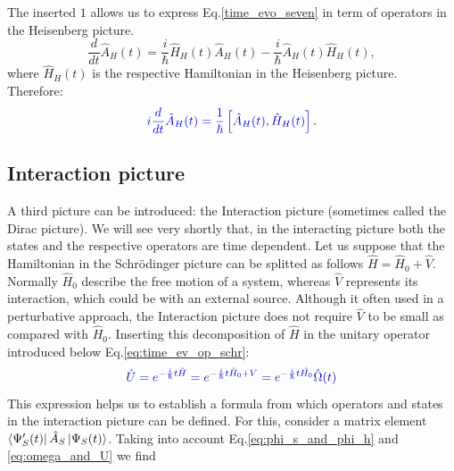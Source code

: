 \documentclass[12pt, titlepage]{article}
\begin{document}
The inserted $ 1 $ allows us to express Eq.\eqref{time_evo_seven} in term of operators in the Heisenberg picture.
\begin{equation}
\frac{d}{dt}\hat{A}_{H}(t)
	=\frac{i}{\hbar}
	\hat{H}_{H}(t)\hat{A}_{H}(t)
	-
	\frac{i}{\hbar}
	\hat{A}_{H}(t)\hat{H}_{H}(t),
\end{equation} 
where $ \hat{H}_{H}(t) $ is the respective Hamiltonian in the Heisenberg  picture.
Therefore:
\begin{equation}\label{eq:Heisenberg_time_dep._eq.}
\textcolor[RGB]{0,0,204}{
i\frac{d}{d t}\hat{A}_{H}(t)=
\frac{1}{\hbar}\left[ \hat{A}_{H}(t),\hat{H}_{H}(t)\right] 
.
}
\end{equation} 
\subsection{Interaction picture}
A third picture can be introduced: the Interaction picture (sometimes called the Dirac picture). We will see very shortly that, in the interacting picture both the states and the respective operators are time dependent.
Let us suppose that the Hamiltonian in the Schrödinger picture can be splitted as follows $ \hat{H} = \hat{H}_{0}+\hat{V} $. Normally $ \hat{H}_{0} $ describe the free motion of a system, whereas  $ \hat{V} $ represents its interaction, which could be with an external source. Although it often used in a perturbative approach, the Interaction picture does not require $ \hat{V} $  to be small as compared with $ \hat{H}_{0} $. 
Inserting this decomposition of $ \hat{H} $ in the unitary operator introduced below Eq.\eqref{eq:time_ev_op_schr}:
\begin{equation}\label{eq:omega_and_U}
\textcolor[RGB]{0,0,204}{
\hat{U}=e^{-\frac{i}{\hbar}t \hat{H}}
=e^{-\frac{i}{\hbar}t \hat{H}_{0}+V}
=
e^{-\frac{i}{\hbar}t \hat{H_{0}}}
\hat{\Omega} (t)
}
\end{equation}
This expression helps us to establish a formula from which operators and states in the interaction picture can be defined. For this, consider a matrix element $ 	\bra{\Psi_{S}^{\prime}(t)}
	\hat{A}_{S}
	\ket{\Psi_{S}(t)} $. Taking into account Eq.\eqref{eq:phi_s_and_phi_h} and \eqref{eq:omega_and_U} we find
\end{document}
